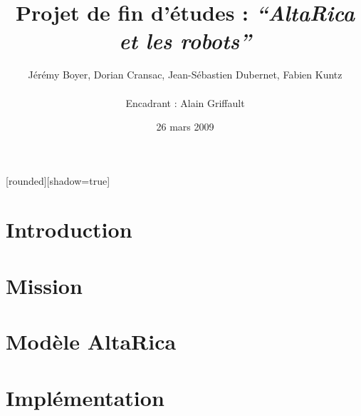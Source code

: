 \documentclass[8pt]{beamer}
\begin{document}

[rounded][shadow=true]

\author[J. Boyer, D. Cransac, J-S. Dubernet, F. Kuntz - Encadrant :
A. Griffault]{Jérémy Boyer, Dorian Cransac, Jean-Sébastien Dubernet,
Fabien Kuntz\\
~\\
\small Encadrant : Alain Griffault}
\title{Projet de fin d'études : \textit{``AltaRica et les robots''}} 
\date{\footnotesize 26 mars 2009}

\setcounter{page}{1}

\frame{\titlepage}
\frame{\tableofcontents}

 \section{Introduction}
 \frame{\tableofcontents[current]}
 

 \section{Mission}
 \frame{\tableofcontents[current]}

%  
%  

 \section{Modèle AltaRica}
 \frame{\tableofcontents[current]}
   
   
%  
%  
  
 \section{Implémentation}
 \frame{\tableofcontents[current]}
\end{document}
